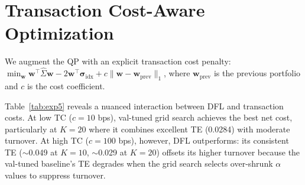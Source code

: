 \documentclass[letterpaper]{article}
\newcommand{\bw}{\mathbf{w}}
\newcommand{\bSigma}{\hat{\Sigma}}
\newcommand{\bsigma}{\boldsymbol{\sigma}}
\begin{document}
\section{Transaction Cost-Aware Optimization}
\label{app:txcost}

We augment the QP with an explicit transaction cost penalty: $\min_\bw \bw^\top \bSigma \bw - 2\bw^\top \bsigma_{\text{idx}} + c \|\bw - \bw_{\text{prev}}\|_1$, where $\bw_{\text{prev}}$ is the previous portfolio and $c$ is the cost coefficient.

\begin{table}[h]
\centering
\caption{Transaction cost experiment. Net cost = TE + $c \times$ TO. All methods use the TC-aware QP.}
\label{tab:exp5}
\footnotesize
{}
\end{table}

Table~\ref{tab:exp5} reveals a nuanced interaction between DFL and transaction costs. At low TC ($c = 10$ bps), val-tuned grid search achieves the best net cost, particularly at $K = 20$ where it combines excellent TE (0.0284) with moderate turnover. At high TC ($c = 100$ bps), however, DFL outperforms: its consistent TE ($\sim$0.049 at $K{=}10$, $\sim$0.029 at $K{=}20$) offsets its higher turnover because the val-tuned baseline's TE degrades when the grid search selects over-shrunk $\alpha$ values to suppress turnover.
\end{document}
